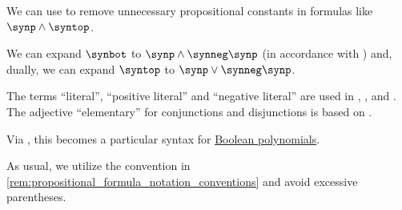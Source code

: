 \begin{comments}
  \item We can use  to remove unnecessary propositional constants in formulas like \( \synp \wedge \syntop \).

  We can expand \( \synbot \) to \( \synp \wedge \synneg \synp \) (in accordance with ) and, dually, we can expand \( \syntop \) to \( \synp \vee \synneg \synp \).

  \item The terms \enquote{literal}, \enquote{positive literal} and \enquote{negative literal} are used in \cite[def. 12.2.1]{Rosen2019DiscreteMathematics}, \cite[103]{DaveyPriestley2002LatticeTheory}, \cite[77]{Mimram2020ProgramEqualsProof} and \cite[132]{Savage2008ModelsOfComputation}. The adjective \enquote{elementary} for conjunctions and disjunctions is based on \cite[36]{Эдельман1975Логика}.

  \item Via , this becomes a particular syntax for \hyperref[def:free_boolean_algebra/polynomial]{Boolean polynomials}.

  \item As usual, we utilize the convention in \cref{rem:propositional_formula_notation_conventions} and avoid excessive parentheses.
\end{comments}

